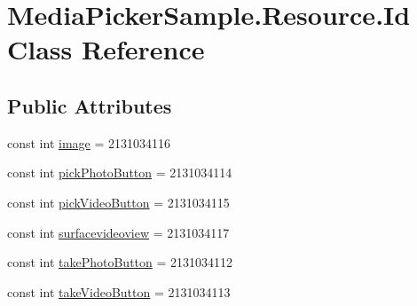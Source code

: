 \hypertarget{class_media_picker_sample_1_1_resource_1_1_id}{\section{Media\+Picker\+Sample.\+Resource.\+Id Class Reference}
\label{class_media_picker_sample_1_1_resource_1_1_id}
}
\subsection*{Public Attributes}
\begin{DoxyCompactItemize}
\item 
const int \hyperlink{class_media_picker_sample_1_1_resource_1_1_id_af3c2f37e172bce6310f0de0c023b15e4}{image} = 2131034116
\item 
const int \hyperlink{class_media_picker_sample_1_1_resource_1_1_id_ae7fb9dc9e829e5c8b26f9a9745e056b8}{pick\+Photo\+Button} = 2131034114
\item 
const int \hyperlink{class_media_picker_sample_1_1_resource_1_1_id_ae31e4d8e84fe54474c63d2277c05d5fd}{pick\+Video\+Button} = 2131034115
\item 
const int \hyperlink{class_media_picker_sample_1_1_resource_1_1_id_a26f8999ca47b4dfe5266e5dd1e3a1ef0}{surfacevideoview} = 2131034117
\item 
const int \hyperlink{class_media_picker_sample_1_1_resource_1_1_id_a9d0195c50f43bdb45333c756f2ce6a24}{take\+Photo\+Button} = 2131034112
\item 
const int \hyperlink{class_media_picker_sample_1_1_resource_1_1_id_ac7fad8b26b29a31f217fa601888615e9}{take\+Video\+Button} = 2131034113
\end{DoxyCompactItemize}


